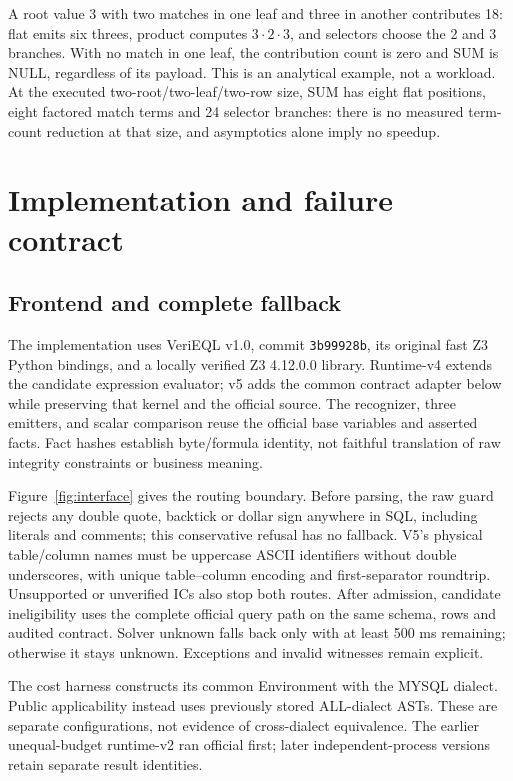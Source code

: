\documentclass[3p,times,authoryear]{elsarticle}
\begin{document}
A root value 3 with two matches in one leaf and three in another contributes 18: flat emits six threes, product computes $3\cdot2\cdot3$, and selectors choose the 2 and 3 branches. With no match in one leaf, the contribution count is zero and SUM is NULL, regardless of its payload. This is an analytical example, not a workload. At the executed two-root/two-leaf/two-row size, SUM has eight flat positions, eight factored match terms and 24 selector branches: there is no measured term-count reduction at that size, and asymptotics alone imply no speedup.

\section{Implementation and failure contract}\label{sec:system}
\subsection{Frontend and complete fallback}
The implementation uses VeriEQL v1.0, commit \texttt{3b99928b}, its original fast Z3 Python bindings, and a locally verified Z3 4.12.0.0 library. Runtime-v4 extends the candidate expression evaluator; v5 adds the common contract adapter below while preserving that kernel and the official source. The recognizer, three emitters, and scalar comparison reuse the official base variables and asserted facts. Fact hashes establish byte/formula identity, not faithful translation of raw integrity constraints or business meaning.

Figure~\ref{fig:interface} gives the routing boundary. Before parsing, the raw guard rejects any double quote, backtick or dollar sign anywhere in SQL, including literals and comments; this conservative refusal has no fallback. V5's physical table/column names must be uppercase ASCII identifiers without double underscores, with unique table--column encoding and first-separator roundtrip. Unsupported or unverified ICs also stop both routes. After admission, candidate ineligibility uses the complete official query path on the same schema, rows and audited contract. Solver unknown falls back only with at least 500 ms remaining; otherwise it stays unknown. Exceptions and invalid witnesses remain explicit.

The cost harness constructs its common Environment with the MYSQL dialect. Public applicability instead uses previously stored ALL-dialect ASTs. These are separate configurations, not evidence of cross-dialect equivalence. The earlier unequal-budget runtime-v2 ran official first; later independent-process versions retain separate result identities.
\end{document}
